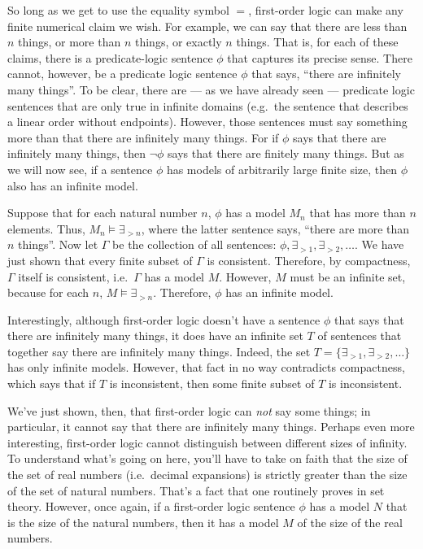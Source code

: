So long as we get to use the equality symbol $=$, first-order logic
can make any finite numerical claim we wish.  For example, we can say
that there are less than $n$ things, or more than $n$ things, or
exactly $n$ things.  That is, for each of these claims, there is a
predicate-logic sentence $\phi$ that captures its precise sense.
There cannot, however, be a predicate logic sentence $\phi$ that says,
``there are infinitely many things''.  To be clear, there are --- as
we have already seen --- predicate logic sentences that are only true
in infinite domains (e.g.\ the sentence that describes a linear order
without endpoints).  However, those sentences must say something more
than that there are infinitely many things.  For if $\phi$ says that
there are infinitely many things, then $\neg \phi$ says that there are
finitely many things.  But as we will now see, if a sentence $\phi$
has models of arbitrarily large finite size, then $\phi$ also has an
infinite model.

Suppose that for each natural number $n$, $\phi$ has a model $M_n$
that has more than $n$ elements.  Thus, $M_n\vDash\exists _{>n}$,
where the latter sentence says, ``there are more than $n$ things''.
Now let $\Gamma$ be the collection of all sentences:
$\phi ,\exists _{>1},\exists _{>2},\dots $.  We have just shown that
every finite subset of $\Gamma$ is consistent.  Therefore, by
compactness, $\Gamma$ itself is consistent, i.e.\ $\Gamma$ has a model
$M$.  However, $M$ must be an infinite set, because for each $n$,
$M\vDash\exists _{>n}$.  Therefore, $\phi$ has an infinite model.

Interestingly, although first-order logic doesn't have a sentence
$\phi$ that says that there are infinitely many things, it does have
an infinite set $T$ of sentences that together say there are
infinitely many things.  Indeed, the set
$T =\{ \exists _{>1},\exists _{>2},\dots \}$ has only infinite models.
However, that fact in no way contradicts compactness, which says that
if $T$ is inconsistent, then some finite subset of $T$ is
inconsistent.

We've just shown, then, that first-order logic can {\it not} say some
things; in particular, it cannot say that there are infinitely many
things.  Perhaps even more interesting, first-order logic cannot
distinguish between different sizes of infinity.  To understand what's
going on here, you'll have to take on faith that the size of the set
of real numbers (i.e.\ decimal expansions) is strictly greater than
the size of the set of natural numbers.  That's a fact that one
routinely proves in set theory.  However, once again, if a first-order
logic sentence $\phi$ has a model $N$ that is the size of the natural
numbers, then it has a model $M$ of the size of the real numbers.

